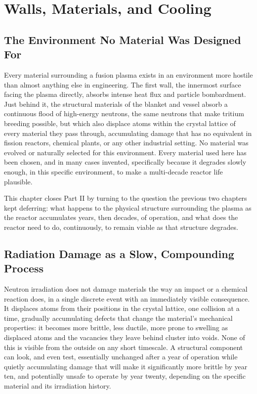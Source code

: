 \chapter{Walls, Materials, and Cooling}

\section{The Environment No Material Was Designed For}

Every material surrounding a fusion plasma exists in an environment more hostile than almost anything else in engineering. The first wall, the innermost surface facing the plasma directly, absorbs intense heat flux and particle bombardment. Just behind it, the structural materials of the blanket and vessel absorb a continuous flood of high-energy neutrons, the same neutrons that make tritium breeding possible, but which also displace atoms within the crystal lattice of every material they pass through, accumulating damage that has no equivalent in fission reactors, chemical plants, or any other industrial setting. No material was evolved or naturally selected for this environment. Every material used here has been chosen, and in many cases invented, specifically because it degrades slowly enough, in this specific environment, to make a multi-decade reactor life plausible.

This chapter closes Part II by turning to the question the previous two chapters kept deferring: what happens to the physical structure surrounding the plasma as the reactor accumulates years, then decades, of operation, and what does the reactor need to do, continuously, to remain viable as that structure degrades.

\section{Radiation Damage as a Slow, Compounding Process}

Neutron irradiation does not damage materials the way an impact or a chemical reaction does, in a single discrete event with an immediately visible consequence. It displaces atoms from their positions in the crystal lattice, one collision at a time, gradually accumulating defects that change the material's mechanical properties: it becomes more brittle, less ductile, more prone to swelling as displaced atoms and the vacancies they leave behind cluster into voids. None of this is visible from the outside on any short timescale. A structural component can look, and even test, essentially unchanged after a year of operation while quietly accumulating damage that will make it significantly more brittle by year ten, and potentially unsafe to operate by year twenty, depending on the specific material and its irradiation history.

